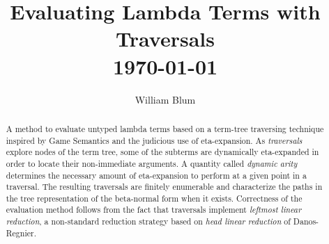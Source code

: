 \documentclass{elsarticle}
\author{William Blum}
\title{Evaluating Lambda Terms with Traversals
\\ \vspace*{1em}
\today}
\makeatletter
\theoremstyle{plain}
\theoremstyle{definition}
\def\etal{\textit{et al.}\@\xspace}
\makeatother
\begin{document}





\begin{abstract}
    A method to evaluate untyped lambda terms based on a term-tree traversing technique inspired by Game Semantics and the judicious use of eta-expansion.
    As \emph{traversals} explore nodes of the term tree,
    some of the subterms are dynamically eta-expanded in order to locate their non-immediate arguments.
    A quantity called \emph{dynamic arity} determines the necessary amount of
    eta-expansion to perform at a given point in a traversal.
    The resulting traversals are finitely enumerable and characterize the paths in the tree representation of the beta-normal form when it exists.
    Correctness of the evaluation method follows from
    the fact that traversals implement \emph{leftmost linear reduction}, a non-standard reduction strategy based on \emph{head linear reduction} of Danos-Regnier.
\end{abstract}
\end{document}
